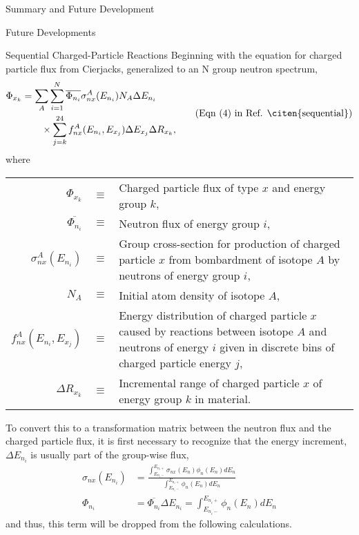 \begin{chapter}{Summary and Future Development}
\begin{section}{Future Developments}
\begin{subsection}{Sequential Charged-Particle Reactions}
      Beginning with the equation for charged particle flux from
      Cierjacks, generalized to an N group neutron spectrum,
      \begin{equation}
        \begin{split}
          \Phi_{x_k} &= \sum_A \sum_{i=1}^N \overline{\Phi_{n_i}} \sigma_{nx}^A(E_{n_i}) N_A
          \Delta E_{n_i}\\
          &\quad\quad \times \sum_{j=k}^{24} f_{nx}^A(E_{n_i},E_{x_j}) \Delta
          E_{x_j} \Delta R_{x_k},
        \end{split}
        \tag{Eqn (4) in Ref. \citen{sequential}}
      \end{equation}
      where\\
      \begin{tabular}{rcp{12cm}}
        $\Phi_{x_k}$ & $\equiv$ & Charged particle flux of type $x$ and energy group
        $k$,\\
        $\overline{\Phi_{n_i}}$ & $\equiv$ & Neutron flux of energy group $i$,\\
        $\sigma_{nx}^A(E_{n_i})$ & $\equiv$ & Group cross-section for production of
        charged particle $x$ from bombardment of isotope $A$ by neutrons of
        energy group $i$,\\
        $N_A$ & $\equiv$ & Initial atom density of isotope $A$,\\
        $f_{nx}^A(E_{n_i},E_{x_j})$ & $\equiv$ & Energy distribution of charged
        particle $x$ caused by reactions between isotope $A$ and neutrons of
        energy $i$ given in discrete bins of charged particle energy $j$,\\
        $\Delta R_{x_k}$ & $\equiv$ & Incremental range of charged particle $x$ of
        energy group $k$ in material.
      \end{tabular}
      
      To convert this to a transformation matrix between the neutron
      flux and the charged particle flux, it is first necessary to
      recognize that the energy increment, $\Delta E_{n_i}$ is usually
      part of the group-wise flux,
      \begin{equation}
        \begin{split}
          \sigma_{nx}(E_{n_i}) &= \frac{\int_{E_{n_i-}}^{E_{n_i+}} \sigma_{nx}(E_n)
            \phi_n(E_n) dE_n}{\int_{E_{n_i-}}^{E_{n_i+}} \phi_n(E_n) dE_n}\\
          \Phi_{n_i} &= \overline{\Phi_{n_i}}\Delta E_{n_i} = \int_{E_{n_i-}}^{E_{n_i+}} \phi_n(E_n) dE_n
        \end{split}
      \end{equation}
      and thus, this term will be dropped from the following calculations.
      

\end{subsection}
\end{section}
\end{chapter}
